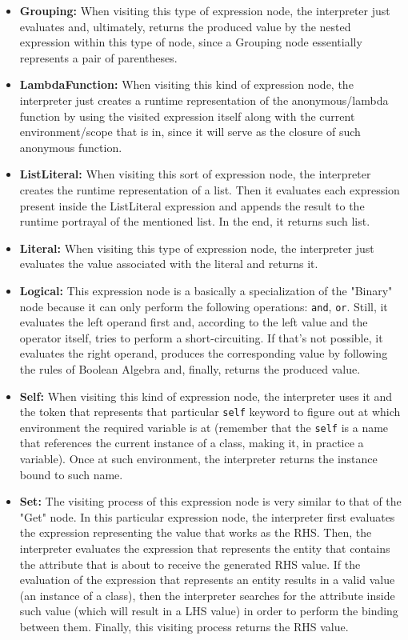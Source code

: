 \begin{itemize}
    \item \textbf{Grouping:} When visiting this type of expression node, the interpreter just evaluates and, ultimately, returns the produced value by the nested expression within this type of node, since a Grouping node essentially represents a pair of parentheses.
    \item \textbf{LambdaFunction:} When visiting this kind of expression node, the interpreter just creates a runtime representation of the anonymous/lambda function by using the visited expression itself along with the current environment/scope that is in, since it will serve as the closure of such anonymous function.
    \item \textbf{ListLiteral:} When visiting this sort of expression node, the interpreter creates the runtime representation of a list. Then it evaluates each expression present inside the ListLiteral expression and appends the result to the runtime portrayal of the mentioned list. In the end, it returns such list.
    \item \textbf{Literal:} When visiting this type of expression node, the interpreter just evaluates the value associated with the literal and returns it.
    \item \textbf{Logical:} This expression node is a basically a specialization of the "Binary" node because it can only perform the following operations: \texttt{and}, \texttt{or}. Still, it evaluates the left operand first and, according to the left value and the operator itself, tries to perform a short-circuiting. If that's not possible, it evaluates the right operand, produces the corresponding value by following the rules of Boolean Algebra and, finally, returns the produced value.
    \item \textbf{Self:} When visiting this kind of expression node, the interpreter uses it and the token that represents that particular \texttt{self} keyword to figure out at which environment the required variable is at (remember that the \texttt{self} is a name that references the current instance of a class, making it, in practice a variable). Once at such environment, the interpreter returns the instance bound to such name.
    \item \textbf{Set:} The visiting process of this expression node is very similar to that of the "Get" node. In this particular expression node, the interpreter first evaluates the expression representing the value that works as the RHS. Then, the interpreter evaluates the expression that represents the entity that contains the attribute that is about to receive the generated RHS value. If the evaluation of the expression that represents an entity results in a valid value (an instance of a class), then the interpreter searches for the attribute inside such value (which will result in a LHS value) in order to perform the binding between them. Finally, this visiting process returns the RHS value.

\end{itemize}
